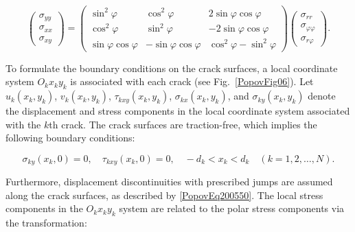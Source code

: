 \begin{equation} \label{PopovEq616969}
	\left(
	\begin{array}{c}
		\sigma_{yy} \\
		\sigma_{xx} \\
		\sigma_{xy}
	\end{array}
	\right)
	=
	\left(
	\begin{array}{ccc}
		\sin^{2} \varphi & \cos^{2} \varphi & 2 \sin \varphi \cos \varphi \\
		\cos^{2} \varphi & \sin^{2} \varphi & -2 \sin \varphi \cos \varphi \\
		\sin \varphi \cos \varphi & -\sin \varphi \cos \varphi & \cos^{2} \varphi - \sin^{2} \varphi
	\end{array}
	\right)
	\left(
	\begin{array}{c}
		\sigma_{rr} \\
		\sigma_{\varphi\varphi} \\
		\sigma_{r\varphi}
	\end{array}
	\right).
\end{equation}

To formulate the boundary conditions on the crack surfaces, a local coordinate system $O_k x_k y_k$ is associated with each crack (see Fig.~\ref{PopovFig06}). Let $u_k(x_k, y_k)$, $v_k(x_k, y_k)$, $\tau_{kxy}(x_k, y_k)$, $\sigma_{kx}(x_k, y_k)$, and $\sigma_{ky}(x_k, y_k)$ denote the displacement and stress components in the local coordinate system associated with the $k$th crack. The crack surfaces are traction-free, which implies the following boundary conditions:

\begin{equation} \label{PopovEq953877}
	\sigma_{ky}(x_k, 0) = 0,\quad \tau_{kxy}(x_k, 0) = 0,\quad -d_k < x_k < d_k\quad (k=1,2,\dots,N).
\end{equation}

Furthermore, displacement discontinuities with prescribed jumps are assumed along the crack surfaces, as described by \eqref{PopovEq200550}. The local stress components in the $O_k x_k y_k$ system are related to the polar stress components via the transformation:

